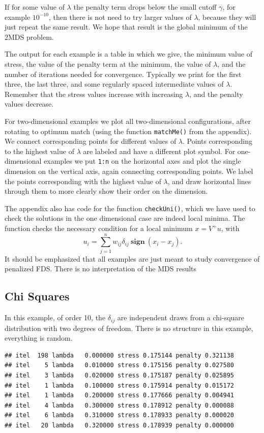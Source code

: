 \documentclass[
  12pt,
]{article}
\begin{document}
If for some value of \(\lambda\) the penalty term drops below the small
cutoff \(\gamma\), for example \ensuremath{10^{-10}}, then there is not
need to try larger values of \(\lambda\), because they will just repeat
the same result. We hope that result is the global minimum of the 2MDS
problem.

The output for each example is a table in which we give, the minimum
value of stress, the value of the penalty term at the minimum, the value
of \(\lambda\), and the number of iterations needed for convergence.
Typically we print for the first three, the last three, and some
regularly spaced intermediate values of \(\lambda\). Remember that the
stress values increase with increasing \(\lambda\), and the penalty
values decrease.

For two-dimensional examples we plot all two-dimensional configurations,
after rotating to optimum match (using the function \texttt{matchMe()}
from the appendix). We connect corresponding points for different values
of \(\lambda\). Points corresponding to the highest value of \(\lambda\)
are labeled and have a different plot symbol. For one-dimensional
examples we put \texttt{1:n} on the horizontal axes and plot the single
dimension on the vertical axis, again connecting corresponding points.
We label the points corresponding with the highest value of \(\lambda\),
and draw horizontal lines through them to more clearly show their order
on the dimension.

The appendix also has code for the function \texttt{checkUni()}, which
we have used to check the solutions in the one dimensional case are
indeed local minima. The function checks the necessary condition for a
local minimum \(x=V^+u\), with \[
u_i=\sum_{j=1}^nw_{ij}\delta_{ij}\ \mathbf{sign}\ (x_i-x_j).
\] It should be emphasized that all examples are just meant to study
convergence of penalized FDS. There is no interpretation of the MDS
results

\subsection{Chi Squares}\label{chi-squares}

In this example, of order 10, the \(\delta_{ij}\) are independent draws
from a chi-square distribution with two degrees of freedom. There is no
structure in this example, everything is random.

\begin{verbatim}
## itel  198 lambda   0.000000 stress 0.175144 penalty 0.321138 
## itel    5 lambda   0.010000 stress 0.175156 penalty 0.027580 
## itel    3 lambda   0.020000 stress 0.175187 penalty 0.025895 
## itel    1 lambda   0.100000 stress 0.175914 penalty 0.015172 
## itel    1 lambda   0.200000 stress 0.177666 penalty 0.004941 
## itel    4 lambda   0.300000 stress 0.178912 penalty 0.000088 
## itel    6 lambda   0.310000 stress 0.178933 penalty 0.000020 
## itel   20 lambda   0.320000 stress 0.178939 penalty 0.000000
\end{verbatim}
\end{document}

